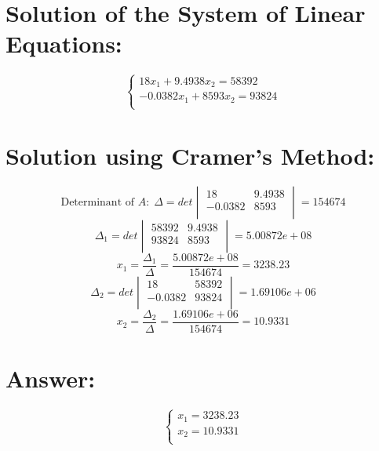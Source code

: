 \documentclass{article}
\begin{document}
\section*{Solution of the System of Linear Equations:}
\begin{equation}
\left\{\begin{array}{rr}
18x_{1} +9.4938x_{2}  = 58392 \\
-0.0382x_{1} +8593x_{2}  = 93824 \\
\end{array}\right.
\end{equation}
\section*{Solution using Cramer's Method:}
\begin{equation}
\text{Determinant of } A: \; \Delta = det\begin{vmatrix}
18 & 9.4938\\
-0.0382 & 8593\\
\end{vmatrix} = 154674
\end{equation}
\begin{equation}
\Delta_{1} = det\begin{vmatrix}
58392 & 9.4938\\
93824 & 8593\\
\end{vmatrix} = 5.00872e+08
\end{equation}
\begin{equation}
x_{1} = \frac{\Delta_{1}}{\Delta} = \frac{5.00872e+08}{154674} = 3238.23
\end{equation}
\begin{equation}
\Delta_{2} = det\begin{vmatrix}
18 & 58392\\
-0.0382 & 93824\\
\end{vmatrix} = 1.69106e+06
\end{equation}
\begin{equation}
x_{2} = \frac{\Delta_{2}}{\Delta} = \frac{1.69106e+06}{154674} = 10.9331
\end{equation}
\section*{Answer:}
\begin{equation}
\left\{\begin{array}{r}
x_{1} = 3238.23\\
x_{2} = 10.9331\\
\end{array}\right.
\end{equation}
\end{document}

